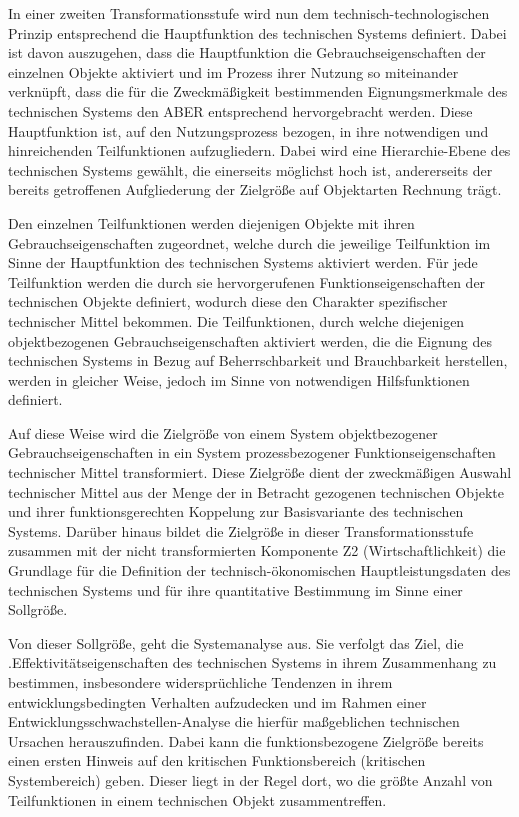 \documentclass[12pt,a4paper]{article}
\begin{document}
In einer zweiten Transformationsstufe wird nun dem technisch-technologischen Prinzip entsprechend die Hauptfunktion des technischen Systems definiert. Dabei ist davon auszugehen, dass die Hauptfunktion die Gebrauchseigenschaften der einzelnen Objekte aktiviert und im Prozess ihrer Nutzung so miteinander verknüpft, dass die für die Zweckmäßigkeit bestimmenden Eignungsmerkmale des technischen Systems den ABER entsprechend hervorgebracht werden. Diese Hauptfunktion ist, auf den Nutzungsprozess bezogen, in ihre notwendigen und hinreichenden Teilfunktionen aufzugliedern. Dabei wird eine Hierarchie-Ebene des technischen Systems gewählt, die einerseits möglichst hoch ist, andererseits der bereits getroffenen Aufgliederung der Zielgröße auf Objektarten Rechnung trägt.

Den einzelnen Teilfunktionen werden diejenigen Objekte mit ihren Gebrauchseigenschaften zugeordnet, welche durch die jeweilige Teilfunktion im Sinne der Hauptfunktion des technischen Systems aktiviert werden. Für jede Teilfunktion werden die durch sie hervorgerufenen Funktionseigenschaften der technischen Objekte definiert, wodurch diese den Charakter spezifischer technischer Mittel bekommen. Die Teilfunktionen, durch welche diejenigen objektbezogenen Gebrauchseigenschaften aktiviert werden, die die Eignung des technischen Systems in Bezug auf Beherrschbarkeit und Brauchbarkeit herstellen, werden in gleicher Weise, jedoch im Sinne von notwendigen Hilfsfunktionen definiert.

Auf diese Weise wird die Zielgröße von einem System objektbezogener Gebrauchseigenschaften in ein System prozessbezogener Funktionseigenschaften technischer Mittel transformiert. Diese Zielgröße dient der zweckmäßigen Auswahl technischer Mittel aus der Menge der in Betracht gezogenen technischen Objekte und ihrer funktionsgerechten Koppelung zur Basisvariante des technischen Systems. Darüber hinaus bildet die Zielgröße in dieser Transformationsstufe zusammen mit der nicht transformierten Komponente Z2 (Wirtschaftlichkeit) die Grundlage für die Definition der technisch-ökonomischen Hauptleistungsdaten des technischen Systems und für ihre quantitative Bestimmung im Sinne einer Sollgröße.

Von dieser Sollgröße, geht die Systemanalyse aus. Sie verfolgt das Ziel, die .Effektivitätseigenschaften des technischen Systems in ihrem Zusammenhang zu bestimmen, insbesondere widersprüchliche Tendenzen in ihrem entwicklungsbedingten Verhalten aufzudecken und im Rahmen einer Entwicklungsschwachstellen-Analyse die hierfür maßgeblichen technischen Ursachen herauszufinden. Dabei kann die funktionsbezogene Zielgröße bereits einen ersten Hinweis auf den kritischen Funktionsbereich (kritischen Systembereich) geben. Dieser liegt in der Regel dort, wo die größte Anzahl von Teilfunktionen in einem technischen Objekt zusammentreffen.
\end{document}
